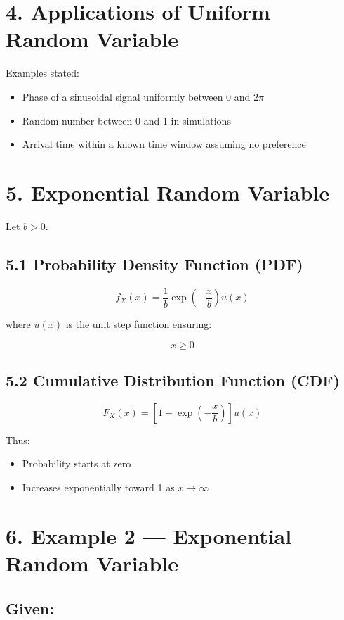 \documentclass[12pt]{article}
\begin{document}
\section*{4. Applications of Uniform Random Variable}

Examples stated:

\begin{itemize}
\item Phase of a sinusoidal signal uniformly between \( 0 \) and \( 2\pi \)
\item Random number between 0 and 1 in simulations
\item Arrival time within a known time window assuming no preference
\end{itemize}

\section*{5. Exponential Random Variable}

Let \( b > 0 \).

\subsection*{5.1 Probability Density Function (PDF)}

\[
f_X(x) = \frac{1}{b} \exp\left(-\frac{x}{b}\right) u(x)
\]

where \( u(x) \) is the unit step function ensuring:

\[
x \ge 0
\]

\subsection*{5.2 Cumulative Distribution Function (CDF)}

\[
F_X(x) = \left[1 - \exp\left(-\frac{x}{b}\right)\right] u(x)
\]

Thus:

\begin{itemize}
\item Probability starts at zero
\item Increases exponentially toward 1 as \( x \to \infty \)
\end{itemize}

\section*{6. Example 2 — Exponential Random Variable}

\subsection*{Given:}
\end{document}
